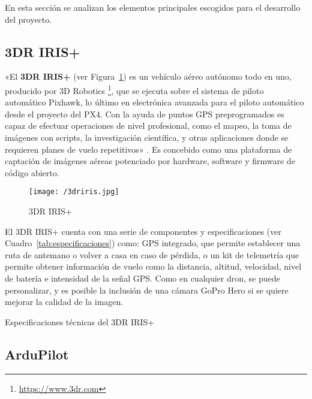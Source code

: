En esta sección se analizan los elementos principales escogidos para el desarrollo del proyecto.

\subsection{3DR IRIS+}
\label{sec:3driris}

«El \textbf{3DR IRIS+} (ver Figura~\ref{fig:3dririsplus}) es un vehículo aéreo autónomo todo en uno, producido por 3D Robotics \footnote{\url{https://www.3dr.com}}, que se ejecuta sobre el sistema de piloto automático Pixhawk, lo último en electrónica avanzada para el piloto automático desde el proyecto del PX4. Con la ayuda de puntos \acs{GPS} preprogramados es capaz de efectuar operaciones de nivel profesional, como el mapeo, la toma de imágenes con scripts, la investigación científica, y otras aplicaciones donde se requieren planes de vuelo repetitivos» \cite{3driris}. Es concebido como una plataforma de captación de imágenes aéreas potenciado por hardware, software y firmware de código abierto.

\begin{figure}[!h]
\begin{center}
\texttt{[image: /3driris.jpg]}
\caption[3DR IRIS+]{3DR IRIS+}
\label{fig:3dririsplus}
\end{center}
\end{figure}

El 3DR IRIS+ cuenta con una serie de componentes y especificaciones (ver Cuadro~\ref{tab:especificaciones}) como: GPS integrado, que permite establecer una ruta de antemano o volver a casa en caso de pérdida, o un kit de telemetría que permite obtener información de vuelo como la distancia, altitud, velocidad, nivel de batería e intensidad de la señal \acs{GPS}. Como en cualquier dron, se puede personalizar, y es posible la inclusión de una cámara GoPro Hero si se quiere mejorar la calidad de la imagen.

\begin{table}[htbp]
  \centering
  {\small
  
  }
  \caption[Especificaciones técnicas del 3DR IRIS+]
  {Especificaciones técnicas del 3DR IRIS+ \cite{especifaciones3dr}}
  \label{tab:especificaciones}
\end{table}

\subsection{ArduPilot}
\label{sec:ardupilot}

